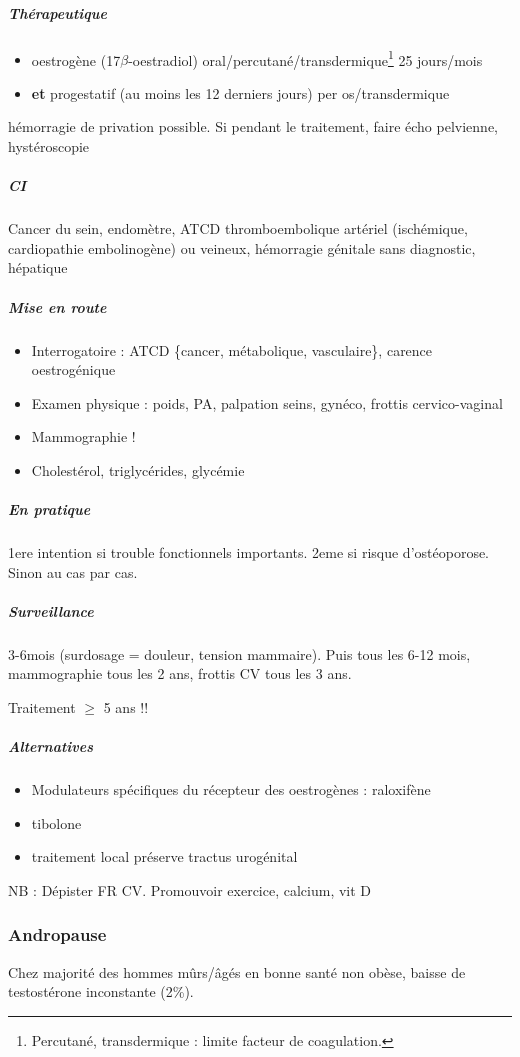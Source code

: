 \documentclass[11pt]{article}
\begin{document}
\subparagraph{Thérapeutique}
\label{sec:org8fc310c}
\begin{itemize}
\item oestrogène (17\(\beta\)-oestradiol) oral/percutané/transdermique\footnote{Percutané, transdermique : limite \inc facteur de coagulation.} 25 jours/mois
\item \textbf{et} progestatif (au moins les 12 derniers jours) per os/transdermique
\end{itemize}
\danger hémorragie de privation possible. Si pendant le traitement, faire écho
pelvienne, hystéroscopie

\subparagraph{CI}
\label{sec:org778659f}
Cancer du sein, endomètre, ATCD thromboembolique artériel (ischémique,
cardiopathie embolinogène) ou veineux, hémorragie génitale sans diagnostic, hépatique

\subparagraph{Mise en route}
\label{sec:orga1ada96}
\begin{itemize}
\item Interrogatoire : ATCD \{cancer, métabolique, vasculaire\}, carence oestrogénique
\item Examen physique : poids, PA, palpation seins, gynéco, frottis cervico-vaginal
\item Mammographie !
\item Cholestérol, triglycérides, glycémie
\end{itemize}

\subparagraph{En pratique}
\label{sec:orgef1011b}
1ere intention si trouble fonctionnels importants. 2eme si risque
d'ostéoporose. Sinon au cas par cas.

\subparagraph{Surveillance}
\label{sec:org978a74b}
3-6mois (surdosage = douleur, tension mammaire). Puis tous les 6-12 mois,
mammographie tous les 2 ans, frottis CV tous les 3 ans.

Traitement \(\ge\) 5 ans !!

\subparagraph{Alternatives}
\label{sec:orgc5c6b47}
\begin{itemize}
\item Modulateurs spécifiques du récepteur des oestrogènes : raloxifène
\item tibolone
\item traitement local préserve tractus urogénital
\end{itemize}

NB : Dépister FR CV. Promouvoir exercice, calcium, vit D

\subsubsection{Andropause}
\label{sec:orga1eba6f}
Chez majorité des hommes mûrs/âgés en bonne santé non obèse, baisse de
testostérone inconstante (2\%).
\end{document}
